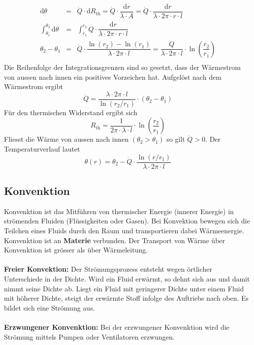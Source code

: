 \begin{equation}  
\boxed{
\begin{array}{lll}
\text{d}\theta&=&\dot{Q}\cdot \text{d}R_{\text{th}}=\dot{Q}\cdot \dfrac{\text{d}r}{\lambda\cdot A}=\dot{Q}\cdot \dfrac{\text{d}r}{\lambda\cdot 2\pi\cdot r\cdot l}
\\
\displaystyle\int_{\theta_1}^{\theta_2}\text{d}\theta&=&\displaystyle\int_{r_1}^{r_2}\dot{Q}\cdot \dfrac{\text{d}r}{\lambda\cdot 2\pi\cdot r\cdot l}
\\
\theta_2-\theta_1&=&\dot{Q}\cdot \dfrac{\ln\left(r_2\right)-\ln\left(r_1\right)}{\lambda\cdot 2\pi\cdot l}=\dfrac{\dot{Q}}{\lambda\cdot 2\pi\cdot l}\cdot \ln\left(\dfrac{r_2}{r_1}\right)
\\
\end{array}
}
\end{equation} 
Die Reihenfolge der Integrationsgrenzen sind so gesetzt, dass der Wärmestrom von aussen nach innen ein positives Vorzeichen hat. Aufgelöst nach dem Wärmestrom ergibt
\begin{equation}
\boxed{\dot{Q}=\dfrac{\lambda\cdot 2\pi\cdot l}{\ln\left(r_2/r_1\right)}\cdot \left(\theta_2-\theta_1\right)}  
\end{equation}  
Für den thermischen Widerstand ergibt sich
\begin{equation}
\boxed{R_{\text{th}}=\dfrac{1}{2\pi\cdot \lambda\cdot l}\cdot \ln\left(\dfrac{r_2}{r_1}\right)} 
\end{equation}  
Fliesst die Wärme von aussen nach innen $\left(\theta_2>\theta_1\right)$ so gilt $\dot{Q}>0$. Der Temperaturverlauf lautet
\begin{equation}
\boxed{\theta\left(r\right)=\theta_2-\dot{Q}\cdot \dfrac{\ln\left(r/r_1\right)}{\lambda\cdot 2\pi\cdot l}}  
\end{equation}  
\subsection{Konvenktion}
Konvenktion ist das Mitführen von thermischer Energie (innerer Energie) in strömenden Fluiden (Flüssigkeiten oder Gasen). Bei Konvektion bewegen sich die Teilchen eines Fluids durch den Raum und transportieren dabei Wärmeenergie. Konvenktion ist an \textbf{Materie} verbunden. Der Transport von Wärme über Konvenktion ist grösser als über Wärmeleitung.
\\\\
\textbf{Freier Konvektion:} Der Strömungsprozess entsteht wegen örtlicher Unterschiede in der Dichte. Wird ein Fluid erwärmt, so dehnt sich aus und damit nimmt seine Dichte ab. Liegt ein Fluid mit geringerer Dichte unter einem Fluid mit höherer Dichte, steigt der erwärmte Stoff infolge des Auftriebs nach oben. Es bildet sich eine Strömung aus.
\\\\
\textbf{Erzwungener Konvenktion:} Bei der erzwungener Konvenktion wird die Strömung mittels Pumpen oder Ventilatoren erzwungen.
